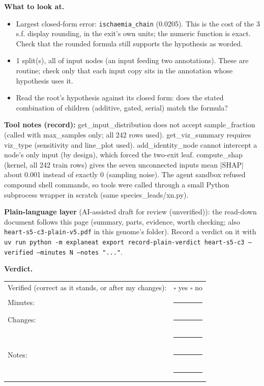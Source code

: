 \documentclass[a4paper,11pt]{article}
\begin{document}
\textbf{What to look at.}
\begin{itemize}
\item Largest closed-form error: \texttt{ischaemia\_\allowbreak{}chain} (0.0205). This is the cost of the 3 s.f. display rounding, in the exit's own units; the numeric function is exact. Check that the rounded formula still supports the hypothesis as worded.
\item 1 split(s), all of input nodes (an input feeding two annotations). These are routine; check only that each input copy sits in the annotation whose hypothesis uses it.
\item Read the root's hypothesis against its closed form: does the stated combination of children (additive, gated, serial) match the formula?
\end{itemize}
\textbf{Tool notes (record):} get\_\allowbreak{}input\_\allowbreak{}distribution does not accept sample\_\allowbreak{}fraction (called with max\_\allowbreak{}samples only; all 242 rows used). get\_\allowbreak{}viz\_\allowbreak{}summary requires viz\_\allowbreak{}type (sensitivity and line\_\allowbreak{}plot used). add\_\allowbreak{}identity\_\allowbreak{}node cannot intercept a node's only input (by design), which forced the two-exit leaf. compute\_\allowbreak{}shap (kernel, all 242 train rows) gives the seven unconnected inputs mean $|$SHAP$|$ about 0.001 instead of exactly 0 (sampling noise). The agent sandbox refused compound shell commands, so tools were called through a small Python subprocess wrapper in scratch (same species\_\allowbreak{}leads/\allowbreak{}xn.py)\allowbreak{}.

\textbf{Plain-language layer} (AI-assisted draft for review (unverified)): the read-down document follows this page (summary, parts, evidence, worth checking; also \texttt{heart-s5-c3-plain-v5.pdf} in this genome's folder). Record a verdict on it with \texttt{uv run python -m explaneat export record-plain-verdict heart-s5-c3 --verified --minutes N --notes "..."}.

\textbf{Verdict.}

\begin{tabularx}{\linewidth}{@{}lX@{}}
Verified (correct as it stands, or after my changes): & $\square$ yes \quad $\square$ no \\[4pt]
Minutes: & \rule{3cm}{0.4pt} \\[4pt]
Changes: & \rule{\linewidth}{0.4pt} \\[10pt]
 & \rule{\linewidth}{0.4pt} \\[4pt]
Notes: & \rule{\linewidth}{0.4pt} \\[10pt]
 & \rule{\linewidth}{0.4pt} \\
\end{tabularx}
\end{document}
